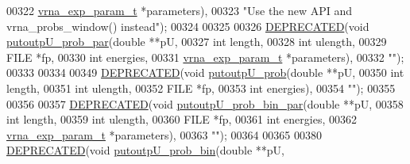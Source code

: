 \begin{DoxyCode}
00322                                       \mbox{\hyperlink{group__energy__parameters_structvrna__exp__param__s}{vrna\_exp\_param\_t}}  *parameters),
00323 \textcolor{stringliteral}{"Use the new API and vrna\_probs\_window() instead"});
00324 
00325 
00326 \mbox{\hyperlink{_l_pfold_8h_aab347a3c03fbe8e7319551b9fa0cce4a}{DEPRECATED}}(\textcolor{keywordtype}{void} \mbox{\hyperlink{_l_pfold_8h_aedb90ad3f54a9bdd6b24f47155e431c3}{putoutpU\_prob\_par}}(\textcolor{keywordtype}{double}            **pU,
00327                                   \textcolor{keywordtype}{int}               length,
00328                                   \textcolor{keywordtype}{int}               ulength,
00329                                   FILE              *fp,
00330                                   \textcolor{keywordtype}{int}               energies,
00331                                   \mbox{\hyperlink{group__energy__parameters_structvrna__exp__param__s}{vrna\_exp\_param\_t}}  *parameters),
00332 \textcolor{stringliteral}{""});
00333 
00334 
00349 \mbox{\hyperlink{_l_pfold_8h_aab347a3c03fbe8e7319551b9fa0cce4a}{DEPRECATED}}(\textcolor{keywordtype}{void}    \mbox{\hyperlink{group__local__pf__fold_ga0bcb751860bbf34e3dfee8c2fbdb3ef3}{putoutpU\_prob}}(\textcolor{keywordtype}{double} **pU,
00350                                  \textcolor{keywordtype}{int}    length,
00351                                  \textcolor{keywordtype}{int}    ulength,
00352                                  FILE   *fp,
00353                                  \textcolor{keywordtype}{int}    energies),
00354 \textcolor{stringliteral}{""});
00355 
00356 
00357 \mbox{\hyperlink{_l_pfold_8h_aab347a3c03fbe8e7319551b9fa0cce4a}{DEPRECATED}}(\textcolor{keywordtype}{void} \mbox{\hyperlink{_l_pfold_8h_ae6f8303a20b9b7377837f4c845bbec04}{putoutpU\_prob\_bin\_par}}(\textcolor{keywordtype}{double}            **pU,
00358                                       \textcolor{keywordtype}{int}               length,
00359                                       \textcolor{keywordtype}{int}               ulength,
00360                                       FILE              *fp,
00361                                       \textcolor{keywordtype}{int}               energies,
00362                                       \mbox{\hyperlink{group__energy__parameters_structvrna__exp__param__s}{vrna\_exp\_param\_t}}  *parameters),
00363 \textcolor{stringliteral}{""});
00364 
00365 
00380 \mbox{\hyperlink{_l_pfold_8h_aab347a3c03fbe8e7319551b9fa0cce4a}{DEPRECATED}}(\textcolor{keywordtype}{void}    \mbox{\hyperlink{group__local__pf__fold_ga9acb00ee10e96b1ca4ea394cd8bcec75}{putoutpU\_prob\_bin}}(\textcolor{keywordtype}{double} **pU,

\end{DoxyCode}
